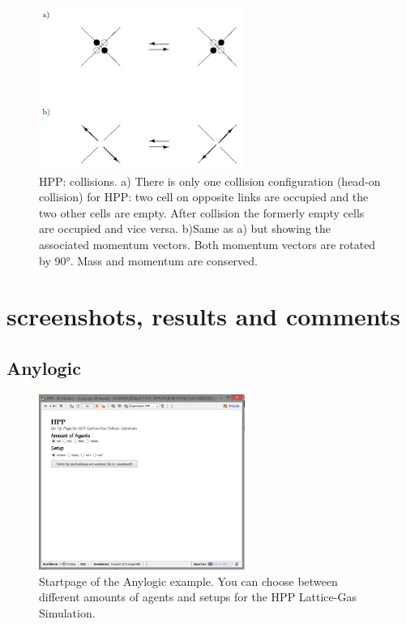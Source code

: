 \documentclass[paper=a4, fontsize=11pt]{scrartcl} %
\numberwithin{equation}{section} %
\numberwithin{figure}{section} %
\numberwithin{table}{section} %
\begin{document}
\begin{figure}[!htp]
	\centering
		\includegraphics[width=0.60\textwidth]{Screenshots/ImplementationRules-2.PNG}
	\caption{HPP: collisions. 
a) There is only one collision configuration (head-on collision) for HPP: two cell on opposite links are occupied and the two other cells are empty. After collision the formerly empty cells are occupied and vice versa. 
b)Same as a) but showing the associated momentum vectors. Both momentum vectors are rotated by 90°. Mass and momentum are conserved.}
	\label{fig:collisions}
\end{figure}

\pagebreak
\section{screenshots, results and comments}

\subsection{Anylogic}

\begin{figure}[!htp]
	\centering
		\includegraphics[width=0.60\textwidth]{Screenshots/Anylogic-Start.PNG}
	\caption{Startpage of the Anylogic example. You can choose between different amounts of agents and setups for the HPP Lattice-Gas Simulation.}
	\label{fig:anylogic-start}
\end{figure}
\end{document}

